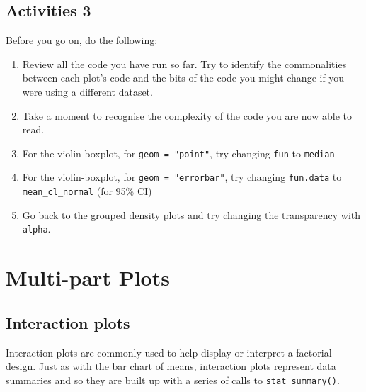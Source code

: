 \documentclass[
  english,
  doc,floatsintext]{apa6}
\begin{document}
\hypertarget{activities-3}{%
\subsection{Activities 3}\label{activities-3}}

Before you go on, do the following:

\begin{enumerate}
\def\labelenumi{\arabic{enumi}.}
\item
  Review all the code you have run so far. Try to identify the commonalities between each plot's code and the bits of the code you might change if you were using a different dataset.
\item
  Take a moment to recognise the complexity of the code you are now able to read.
\item
  For the violin-boxplot, for \texttt{geom\ =\ "point"}, try changing \texttt{fun} to \texttt{median}
\item
  For the violin-boxplot, for \texttt{geom\ =\ "errorbar"}, try changing \texttt{fun.data} to \texttt{mean\_cl\_normal} (for 95\% CI)
\item
  Go back to the grouped density plots and try changing the transparency with \texttt{alpha}.
\end{enumerate}

\hypertarget{multi-part-plots}{%
\section{Multi-part Plots}\label{multi-part-plots}}

\hypertarget{interaction-plots}{%
\subsection{Interaction plots}\label{interaction-plots}}

Interaction plots are commonly used to help display or interpret a factorial design. Just as with the bar chart of means, interaction plots represent data summaries and so they are built up with a series of calls to \texttt{stat\_summary()}.
\end{document}
